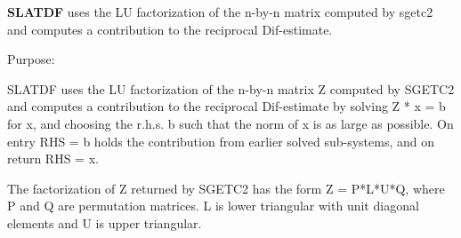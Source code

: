 {\bfseries S\+L\+A\+T\+D\+F} uses the L\+U factorization of the n-\/by-\/n matrix computed by sgetc2 and computes a contribution to the reciprocal Dif-\/estimate. 

 \begin{DoxyParagraph}{Purpose\+: }
\begin{DoxyVerb} SLATDF uses the LU factorization of the n-by-n matrix Z computed by
 SGETC2 and computes a contribution to the reciprocal Dif-estimate
 by solving Z * x = b for x, and choosing the r.h.s. b such that
 the norm of x is as large as possible. On entry RHS = b holds the
 contribution from earlier solved sub-systems, and on return RHS = x.

 The factorization of Z returned by SGETC2 has the form Z = P*L*U*Q,
 where P and Q are permutation matrices. L is lower triangular with
 unit diagonal elements and U is upper triangular.\end{DoxyVerb}
 
\end{DoxyParagraph}

